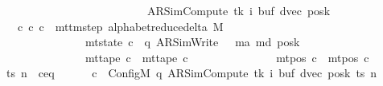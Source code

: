 \begin{isabellebody}
\ \ \ \ \ \ \ \ \ \ \ \ \ \ \ \ \ \ \ \ \ \ \ \ \ \ {\isacharparenleft}{\kern0pt}AR{\isacharunderscore}{\kern0pt}SimCompute{\isacharcomma}{\kern0pt}\ tk{\isacharcomma}{\kern0pt}\ i{\isacharcomma}{\kern0pt}\ buf{\isacharcomma}{\kern0pt}\ dvec{\isacharcomma}{\kern0pt}\ posk{\isacharparenright}{\kern0pt}{\isachardoublequoteclose}\isanewline
\ \ \ {\isachardoublequoteopen}{\isasymexists}c{\isacharprime}{\kern0pt}{\isacharprime}{\kern0pt}{\isachardot}{\kern0pt}\ {\isacharparenleft}{\kern0pt}c{\isacharprime}{\kern0pt}{\isacharcomma}{\kern0pt}\ c{\isacharprime}{\kern0pt}{\isacharprime}{\kern0pt}{\isacharparenright}{\kern0pt}\ {\isasymin}\ mttm{\isacharunderscore}{\kern0pt}step\ {\isacharparenleft}{\kern0pt}alphabet{\isacharunderscore}{\kern0pt}reduce{\isacharunderscore}{\kern0pt}delta\ M{\isacharparenright}{\kern0pt}\isanewline
\ \ \ \ \ \ \ \ \ \ \ \ \ \ {\isasymand}\ mt{\isacharunderscore}{\kern0pt}state\ c{\isacharprime}{\kern0pt}{\isacharprime}{\kern0pt}\ {\isacharequal}{\kern0pt}\ {\isacharparenleft}{\kern0pt}q{\isacharprime}{\kern0pt}{\isacharcomma}{\kern0pt}\ AR{\isacharunderscore}{\kern0pt}SimWrite{\isacharcomma}{\kern0pt}\ {}{\isacharcomma}{\kern0pt}\ {}{\isacharcomma}{\kern0pt}\ m{\isacharunderscore}{\kern0pt}a{\isacharprime}{\kern0pt}{\isacharcomma}{\kern0pt}\ m{\isacharunderscore}{\kern0pt}d{\isacharcomma}{\kern0pt}\ posk{\isacharparenright}{\kern0pt}\isanewline
\ \ \ \ \ \ \ \ \ \ \ \ \ \ {\isasymand}\ mt{\isacharunderscore}{\kern0pt}tape\ c{\isacharprime}{\kern0pt}{\isacharprime}{\kern0pt}\ {\isacharequal}{\kern0pt}\ mt{\isacharunderscore}{\kern0pt}tape\ c{\isacharprime}{\kern0pt}\isanewline
\ \ \ \ \ \ \ \ \ \ \ \ \ \ {\isasymand}\ mt{\isacharunderscore}{\kern0pt}pos\ c{\isacharprime}{\kern0pt}{\isacharprime}{\kern0pt}\ {\isacharequal}{\kern0pt}\ mt{\isacharunderscore}{\kern0pt}pos\ c{\isacharprime}{\kern0pt}{\isachardoublequoteclose}\isanewline
%
\isadelimproof
%
\endisadelimproof
%
\isatagproof
{}\isamarkupfalse%
\ {\isacharminus}{\kern0pt}\isanewline
\ \ \isamarkupfalse%
\ ts\ n\ \ c{\isacharprime}{\kern0pt}{\isacharunderscore}{\kern0pt}eq{\isacharcolon}{\kern0pt}\isanewline
\ \ \ \ \ \ {\isachardoublequoteopen}c{\isacharprime}{\kern0pt}\ {\isacharequal}{\kern0pt}\ Config\isactrlsub M\ {\isacharparenleft}{\kern0pt}q{\isacharcomma}{\kern0pt}\ AR{\isacharunderscore}{\kern0pt}SimCompute{\isacharcomma}{\kern0pt}\ tk{\isacharcomma}{\kern0pt}\ i{\isacharcomma}{\kern0pt}\ buf{\isacharcomma}{\kern0pt}\ dvec{\isacharcomma}{\kern0pt}\ posk{\isacharparenright}{\kern0pt}\ ts\ n{\isachardoublequoteclose}\isanewline

\end{isabellebody}
